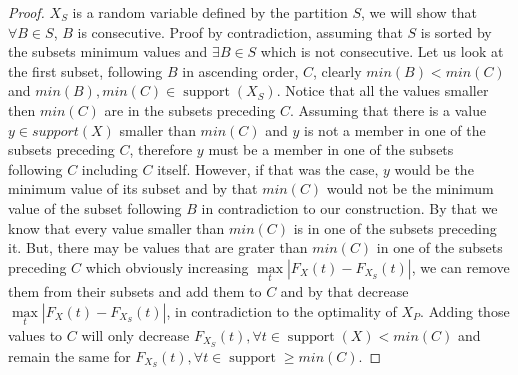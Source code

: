 \documentclass[review]{elsarticle}
\newtheorem{lemma}{Lemma}
\newtheorem{definition}{Definition}
\DeclareMathOperator{\support}{support}
\begin{document}




\begin{proof}
$X_S$ is a random variable defined by the partition $S$, we will show that $\forall B\in S$, $B$ is consecutive.
Proof by contradiction, assuming that $S$ is sorted by the subsets minimum values and $\exists B \in S $ which is not consecutive. Let us look at the first subset, following $B$ in ascending order, $C$, clearly $min(B)<min(C)$ and $min(B),min(C) \in \support(X_S)$. Notice that all the values smaller then $min(C)$ are in the subsets preceding $C$. Assuming that there is a value $y\in support(X)$ smaller than $min(C)$ and $y$ is not a member in one of the subsets preceding $C$, therefore $y$ must be a member in one of the subsets following $C$ including $C$ itself. However, if that was the case, $y$ would be the minimum value of its subset and by that $min(C)$ would not be the minimum value of the subset following $B$ in contradiction to our construction. By that we know that every value smaller than $min(C)$ is in one of the subsets preceding it. But, there may be values that are grater than $min(C)$ in one of the subsets preceding $C$ which obviously increasing $\max\limits_{t}|F_{X}(t)-F_{X_S}(t)|$, we can remove them from their subsets and add them to $C$ and by that decrease $\max\limits_{t}|F_{X}(t)-F_{X_S}(t)|$, in contradiction to the optimality of $X_P$. Adding those values to $C$ will only decrease $F_{X_S}(t), \forall t\in \support(X)<min(C)$ and remain the same for $F_{X_S}(t), \forall t \in \support\geq min(C)$.
\end{proof}
\end{document}
